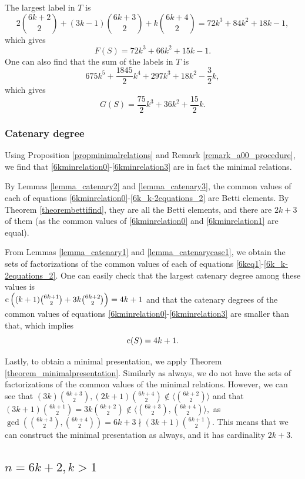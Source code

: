 \documentclass[12pt]{article}
\theoremstyle{remark}
\begin{document}
The largest label in $T$ is  
$$  2\binom{6k+2}{2} + (3k-1)\binom{6k+3}{2} + k\binom{6k+4}{2} = 72 k^3 + 84 k^2 + 18 k - 1,$$ 
which gives
$$ F(S) = 72 k^3 + 66 k^2 + 15k - 1.$$
One can also find that the sum of the labels in $T$ is 
$$ 675 k^5 + \frac{1845}{2} k^4 + 297 k^3 + 18 k^2 - \frac{3}{2} k,$$
which gives
$$ G(S)  = \frac{75}{2}k^3 + 36k^2 + \frac{15}{2}k.$$

\subsubsection{Catenary degree}
Using Proposition \ref{propminimalrelations} and Remark \ref{remark_a00_procedure}, we find that \eqref{6kminrelation0}-\eqref{6kminrelation3} are in fact the minimal relations.

By Lemmas \ref{lemma_catenary2} and \ref{lemma_catenary3}, the common values of each of equations \eqref{6kminrelation0}-\eqref{6k_k-2equations_2} are Betti elements. 
By Theorem \ref{theorembettifind}, they are all the Betti elements, and there are $2k+3$ of them (as the common values of \eqref{6kminrelation0} and \eqref{6kminrelation1} are equal).

From Lemmas \ref{lemma_catenary1} and \ref{lemma_catenarycase1}, we obtain the sets of factorizations of the common values of each of equations \eqref{6keq1}-\eqref{6k_k-2equations_2}.
One can easily check that the largest catenary degree among these values is \\ $\textup{c} \left((k+1)\binom{6k+1}{2} + 3k \binom{6k+2}{2} \right) = 4k+1$ and that the catenary degrees of the common values of equations \eqref{6kminrelation0}-\eqref{6kminrelation3} are smaller than that, which implies
$$ \textup{c}(S) = 4k+1.$$

Lastly, to obtain a minimal presentation, we apply Theorem \ref{theorem_minimalpresentation}. Similarly as always, we do not have the sets of factorizations of the common values of the minimal relations. However, we can see that $(3k)\binom{6k+3}{2}, (2k+1)\binom{6k+4}{2} \notin \langle \binom{6k+2}{2} \rangle$ and that 
$ (3k+1)\binom{6k+1}{2} = 3k \binom{6k+2}{2} \notin \langle \binom{6k+3}{2}, \binom{6k+4}{2} \rangle, $
as $\gcd \left( \binom{6k+3}{2}, \binom{6k+4}{2} \right) = 6k+3 \nmid (3k+1)\binom{6k+1}{2}$. This means that we can construct the minimal presentation as always, and it has cardinality $2k+3$.


\subsection{$n = 6k+2, k>1$}
\end{document}
